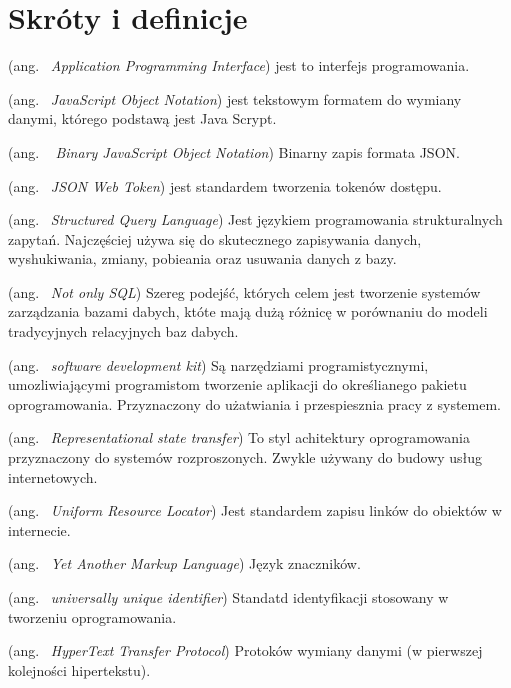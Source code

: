 \chapter*{Skróty i definicje}\mbox{}
\label{sec:skroty}
\noindent
\begin{description}[labelwidth=*]
  \item [API] (ang. \ \emph{Application Programming Interface}) jest to interfejs programowania.
  \item [JSON] (ang. \ \emph{JavaScript Object Notation}) jest tekstowym formatem do wymiany danymi, którego podstawą jest Java Scrypt.
  \item [BSON] (ang. \ \emph{ Binary JavaScript Object Notation}) Binarny zapis formata JSON.
  \item [JWT] (ang. \ \emph{JSON Web Token}) jest standardem tworzenia tokenów dostępu.
  \item [SQL] (ang. \ \emph{Structured Query Language}) Jest językiem programowania strukturalnych zapytań. Najczęściej używa się do skutecznego zapisywania danych, wyshukiwania, zmiany, pobieania oraz usuwania danych z bazy. 
  \item [NoSQL] (ang. \ \emph{Not only SQL}) Szereg podejść, których celem jest tworzenie systemów zarządzania bazami dabych, któte mają dużą różnicę w porównaniu do modeli tradycyjnych relacyjnych baz dabych.
  \item [SDK] (ang. \ \emph{software development kit}) Są narzędziami programistycznymi, umozliwiającymi programistom tworzenie aplikacji do określianego pakietu oprogramowania. Przyznaczony do użatwiania i przespiesznia pracy z systemem.
  \item [Rest] (ang. \ \emph{Representational state transfer}) To styl achitektury oprogramowania przyznaczony do systemów rozproszonych. Zwykle używany do budowy usług internetowych.
  \item [URL] (ang. \ \emph{Uniform Resource Locator}) Jest standardem zapisu linków do obiektów w internecie.
  \item [YAML] (ang. \ \emph{Yet Another Markup Language}) Język znaczników.
  \item [UUID] (ang. \ \emph{universally unique identifier}) Standatd identyfikacji stosowany w tworzeniu oprogramowania.
  \item [HTTP] (ang. \ \emph{HyperText Transfer Protocol}) Protoków wymiany danymi (w pierwszej kolejności hipertekstu).
\end{description}